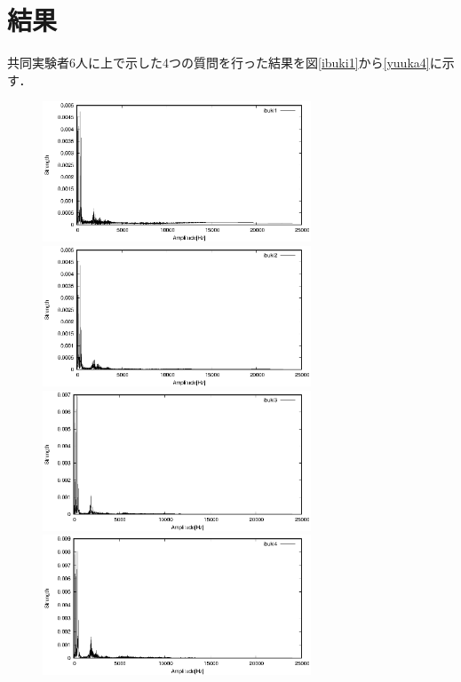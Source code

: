 \documentclass[titlepage]{jarticle}
\begin{document}
\section{結果}
共同実験者6人に上で示した4つの質問を行った結果を図\ref{ibuki1}から\ref{yuuka4}に示す．
\begin{figure}[H]
  \begin{minipage}{0.495\hsize}
    \centering
    \includegraphics[width=8cm]{img/ibuki1.eps}
    \caption{}
    \label{ibuki1}
  \end{minipage}
  \begin{minipage}{0.495\hsize}
    \centering
    \includegraphics[width=8cm]{img/ibuki2.eps}
    \caption{}
    \label{ibuki2}
  \end{minipage}

  \begin{minipage}{0.495\hsize}
    \centering
    \includegraphics[width=8cm]{img/ibuki3.eps}
    \caption{}
    \label{ibuki3}
  \end{minipage}
  \begin{minipage}{0.495\hsize}
    \centering
    \includegraphics[width=8cm]{img/ibuki4.eps}
    \caption{}
    \label{ibuki4}
  \end{minipage}
\end{figure}
\end{document}
